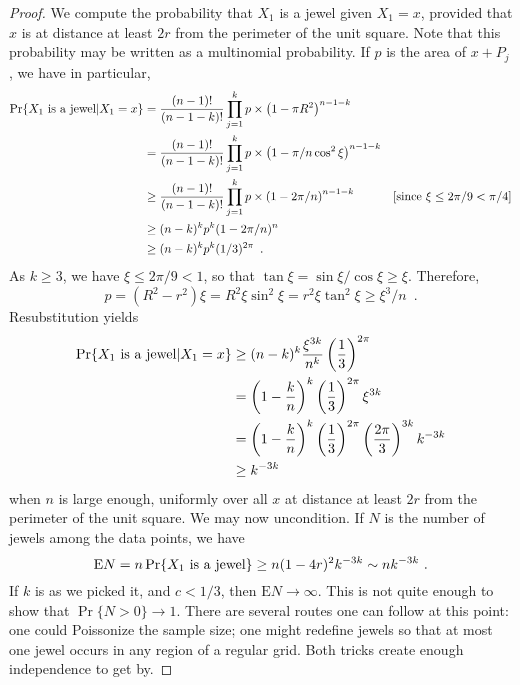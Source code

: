 \documentclass[lotsofwhite,charterfonts]{patmorin}
\newcommand{\PROB}{\Pr}
\newcommand{\EXP}{\mathrm{E}}
\begin{document}
\begin{proof}
We compute the probability that $X_1$ is a jewel
given $X_1 = x$, provided that $x$ is at distance at
least $2r$ from the perimeter of the unit square.
Note that this probability may be written as
a multinomial probability. If $p$ is the area
of $x+P_j$, we have in particular,
$$
\begin{aligned}
\PROB \{ X_1 ~\hbox{\rm is a jewel} | X_1 = x \}
&=  {(n-1)! \over (n-1-k)!} \prod_{j=1}^k p \times \left( 1 - \pi R^2 \right)^{n-1-k} \\
&=  {(n-1)! \over (n-1-k)!} \prod_{j=1}^k p \times \left( 1 - \pi/n\cos^2\xi \right)^{n-1-k} \\
&\ge  {(n-1)! \over (n-1-k)!} \prod_{j=1}^k p \times \left( 1 - 2\pi/n \right)^{n-1-k} & \mbox{[since $\xi \le 2\pi/9 < \pi/4$]} \\
 &\ge  (n-k)^k p^k (1-2\pi/n)^n \\
&\ge  (n-k)^k p^k (1/3)^{2\pi} \enspace . 
\end{aligned}
$$
As $k \ge 3$, we have $\xi \le 2\pi/9 < 1$, so that
$\tan \xi = \sin \xi / \cos \xi \ge \xi$.
Therefore, 
$$
p = (R^2 - r^2) \xi = R^2 \xi \sin^2 \xi
  = r^2 \xi \tan^2 \xi \ge \xi^3/n \enspace .
$$
Resubstitution yields
$$
\begin{aligned}
\PROB \{ X_1 ~\hbox{\rm is a jewel} | X_1 = x \}
& \ge (n-k)^k {\xi^{3k} \over n^k} \left( {1 \over 3} \right)^{2\pi} \\
& =   \left( 1 - {k \over n} \right)^k  
    \left( {1 \over 3} \right)^{2\pi}
    \xi^{3k} \\
& = \left( 1 - {k \over n} \right)^k  
    \left( {1 \over 3} \right)^{2\pi}
    \left({2\pi\over 3}\right)^{3k} k^{-3k}\\
& \ge k^{-3k}
\end{aligned}
$$
when $n$ is large enough, uniformly over all $x$
at distance at least $2r$ from the perimeter of the unit square.
We may now uncondition. If $N$ is the 
number of jewels among the data points, we have
$$
\EXP N
 = n \PROB \{ X_1 ~\hbox{\rm is a jewel} \}
 \ge n (1-4r)^2 k^{-3k}
 \sim n k^{-3k}~.
$$
If $k$ is as we picked it, and $c < 1/3$,
then $\EXP N \to \infty$.
This is not quite enough to show that 
$\PROB \{ N > 0 \} \to 1$.
There are several routes one can follow at this
point: one could Poissonize the sample
size; one might redefine jewels so that
at most one jewel occurs in any region of
a regular grid. Both tricks create
enough independence to get by.

\end{proof}
\end{document}
